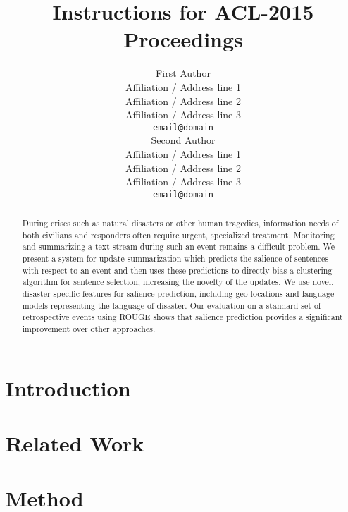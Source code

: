 \documentclass[11pt]{article}
\title{Instructions for ACL-2015 Proceedings}
\author{First Author \\
  Affiliation / Address line 1 \\
  Affiliation / Address line 2 \\
  Affiliation / Address line 3 \\
  {\tt email@domain} \\\And
  Second Author \\
  Affiliation / Address line 1 \\
  Affiliation / Address line 2 \\
  Affiliation / Address line 3 \\
  {\tt email@domain} \\}
\date{}
\begin{document}
\maketitle
\begin{abstract}
During crises such as natural disasters or other human tragedies, information
needs of both civilians and responders often require urgent, specialized
treatment.  
Monitoring and summarizing a text stream
during such an event remains a difficult problem. 
We present a system for update summarization which predicts the salience of 
sentences with respect to an event and then uses these
predictions to directly bias a clustering algorithm for sentence selection,
increasing the novelty of the updates. We use novel, disaster-specific features
for salience prediction, including geo-locations and language models
representing the language of disaster.
Our evaluation on a standard set of retrospective events using ROUGE shows 
that salience prediction provides a significant improvement over 
other approaches.



\end{abstract}

\section{Introduction}



\section{Related Work}


%

\section{Method}

\end{document}
